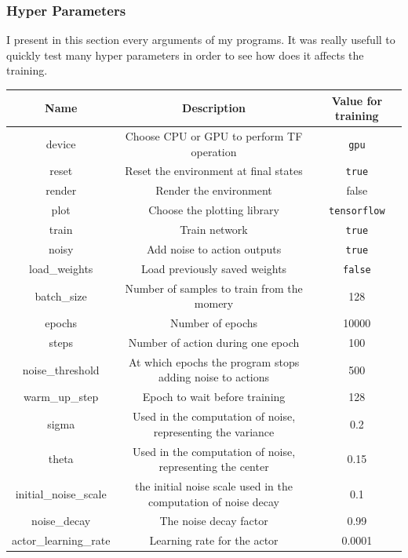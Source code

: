\documentclass{article}
\begin{document}
\subsubsection{Hyper Parameters}
\label{subsubsec:hp_params}

I present in this section every arguments of my programs. It was really usefull
to quickly test many hyper parameters in order to see how does it affects the
training.

\begin{table}[ht]
  \centering
  \begin{adjustbox}{width=1\textwidth}
    \begin{tabular}{ |c|c|c| }
      \hline
      \textbf{Name} & \textbf{Description} & \textbf{Value for training} \\
      \hline
      device & Choose CPU or GPU to perform TF operation & \verb?gpu? \\
      reset & Reset the environment at final states & \verb?true? \\ 
      render & Render the environment\footnotemark & false \\
      plot & Choose the plotting library & \verb?tensorflow? \\
      train & Train network & \verb?true? \\
      noisy & Add noise to action outputs & \verb?true? \\
      load\_weights & Load previously saved weights & \verb?false? \\
      batch\_size & Number of samples to train from the momery & 128 \\
      epochs & Number of epochs & 10000 \\
      steps & Number of action during one epoch & 100 \\ 
      noise\_threshold & At which epochs the program stops adding noise to actions & 500 \\
      warm\_up\_step & Epoch to wait before training & 128 \\
      sigma & Used in the computation of noise, representing the variance & 0.2 \\
      theta & Used in the computation of noise, representing the center & 0.15 \\
      initial\_noise\_scale & the initial noise scale used in the computation of noise decay & 0.1 \\
      noise\_decay & The noise decay factor & 0.99 \\
      actor\_learning\_rate & Learning rate for the actor & 0.0001 \\

\end{tabular}
\end{adjustbox}
\end{table}
\end{document}
